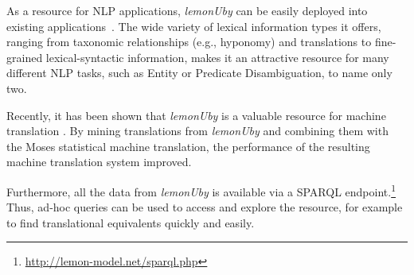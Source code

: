 As a resource for NLP applications, \emph{le\-mon\-U\-by} can be easily deployed into existing
applications~\cite{unger2010generating}. The wide variety of lexical information types it offers, ranging from
taxonomic relationships (e.g., hyponomy) and translations to fine-grained lexical-syntactic information,
makes it an attractive resource for many different NLP tasks, such as Entity or Predicate Disambiguation, to name only two.

Recently, it has been shown that \emph{le\-mon\-U\-by} is a valuable resource for machine translation \cite{mccrae-cimiano:2013:NLP-LOD-SWAIE}. 
By mining translations from \emph{le\-mon\-U\-by} and combining them with
the Moses statistical machine translation, the performance of the resulting machine translation system improved.

Furthermore, all the data from \emph{le\-mon\-U\-by} is available via
a SPARQL endpoint.\footnote{\url{http://lemon-model.net/sparql.php}} Thus, ad-hoc queries can be used to access and explore the resource, for example 
to find translational equivalents quickly and easily.






